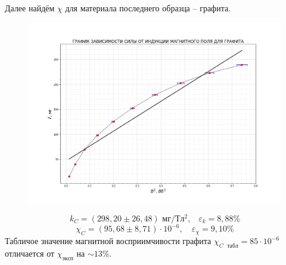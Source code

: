 \documentclass[a4paper,12pt]{article}
\begin{document}
Далее найдём $\chi$ для материала последнего образца -- графита.

\begin{figure}[H]\label{fig: C}
    \centering
    \includegraphics[width = \textwidth]{F(B2)С.png}
\end{figure}
\[k_{C} = (298,20 \pm 26,48) \text{ мг/$Тл^2$,} \quad \varepsilon_{k} = 8,88 \%\]
\[\chi_{C} = (95,68 \pm 8,71) \cdot 10^{-6}, \quad \varepsilon_{\chi} = 9,10\%\]
Табличое значение магнитной восприимчивости графита $\chi_{C \text{ }табл} =  85 \cdot 10^{-6}$ отличается от $\chi_{эксп}$ на $\sim 13 \%$.
\end{document}
